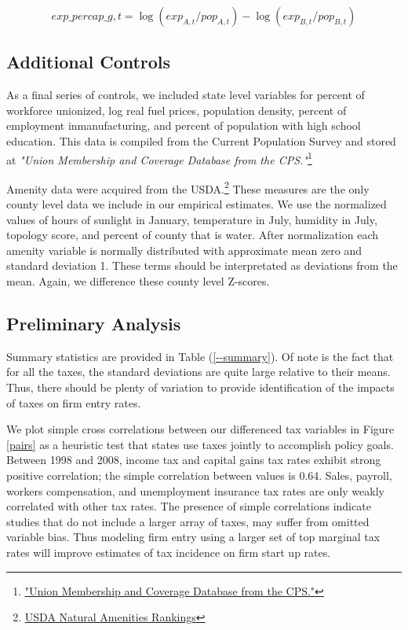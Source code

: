 \begin{equation} exp\_percap\_{g,t} = \log(exp_{A,t}/pop_{A,t}) - \log(exp_{B,t}/pop_{B,t}) \end{equation}

\subsection{Additional Controls}

As a final series of controls, we included state level variables for percent of workforce unionized, log real fuel prices, population density, percent of employment inmanufacturing, and percent of population with high school education. This data is compiled from the Current Population Survey and stored at \textit{"Union Membership and Coverage Database from the CPS."}\footnote{\href{http://www.unionstats.com/}{"Union Membership and Coverage Database from the CPS."}}

Amenity data were acquired from the USDA.\footnote{\href{http://www.ers.usda.gov/data-products/natural-amenities-scale.aspx}{USDA Natural Amenities Rankings}} These measures are the only county level data we include in our empirical estimates. We use the normalized values of hours of sunlight in January, temperature in July, humidity in July, topology score, and percent of county that is water. After normalization each amenity variable is normally distributed with approximate mean zero and standard deviation 1. These terms should be interpretated  as deviations from the mean. Again, we difference these county level Z-scores.

\subsection{Preliminary Analysis}

Summary statistics are provided in Table (\ref{--summary}). Of note is the fact that for all the taxes, the standard deviations are quite large relative to their means. Thus, there should be plenty of variation to provide identification of the impacts of taxes on firm entry rates.

We plot simple cross correlations between our differenced tax variables in Figure \ref{pairs} as a heuristic test that states use taxes jointly to accomplish policy goals. Between 1998 and 2008, income tax and capital gains tax rates exhibit strong positive correlation; the simple correlation between values is 0.64. Sales, payroll, workers compensation, and unemployment insurance tax rates are only weakly correlated with other tax rates. The presence of simple correlations indicate studies that do not include a larger array of taxes, may suffer from omitted variable bias. Thus modeling firm entry using a larger set of top marginal tax rates will improve estimates of tax incidence on firm start up rates.